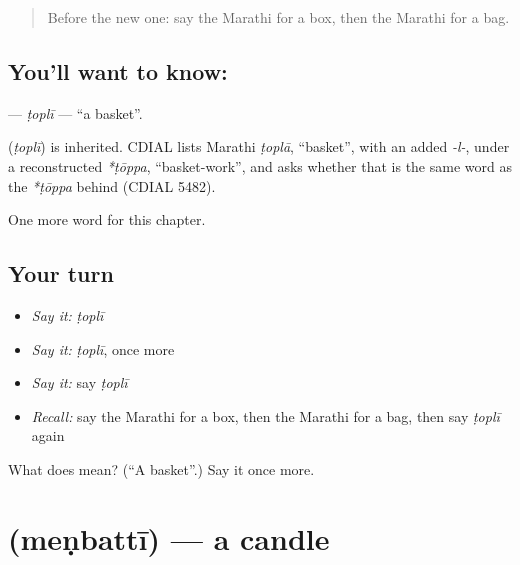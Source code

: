 \label{lesson:MR-C133-topli}



\begin{quote}
Before the new one: say the Marathi for a box, then the Marathi for a bag.
\end{quote}

\subsection*{You'll want to know: }
\textbf{} — \emph{ṭoplī} — \textquotedblleft{}a basket\textquotedblright{}.

\begin{cousinweb}
\textbf{} (\emph{ṭoplī}) is inherited. CDIAL lists Marathi \emph{ṭoplā}, \textquotedblleft{}basket\textquotedblright{}, with an added \emph{-l-}, under a reconstructed \emph{*ṭōppa}, \textquotedblleft{}basket-work\textquotedblright{}, and asks whether that is the same word as the \emph{*ṭōppa} behind \textbf{} (CDIAL 5482).
\end{cousinweb}

\begin{grammarlens}[title={What you've built}]
One more word for this chapter.
\end{grammarlens}

\subsection*{Your turn}
\begin{itemize}
\raggedright
  \item \emph{Say it:} \emph{ṭoplī}
  \item \emph{Say it:} \emph{ṭoplī}, once more
  \item \emph{Say it:} say \emph{ṭoplī}
  \item \emph{Recall:} say the Marathi for a box, then the Marathi for a bag, then say \emph{ṭoplī} again
\end{itemize}

\begin{tcolorbox}[breakable,colback=teal!4,colframe=teal!35!black,title={Before you move on}]
What does  mean? (\textquotedblleft{}A basket\textquotedblright{}.) Say it once more.
\end{tcolorbox}
\section[\texorpdfstring{\mr{मेणबत्ती} (meṇbattī)}{मेणबत्ती (meṇbattī)}]{ (meṇbattī) — a candle}

